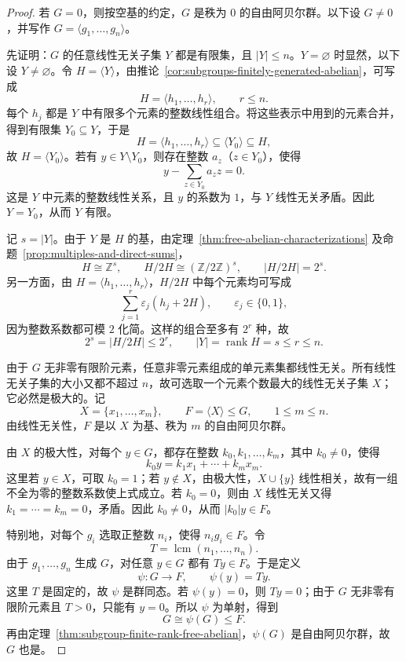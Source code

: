 \begin{proof}
若 $G=0$，则按空基的约定，$G$ 是秩为 $0$ 的自由阿贝尔群。以下设 $G\ne0$，并写作 $G=\langle g_1,\ldots,g_n\rangle$。

先证明：$G$ 的任意线性无关子集 $Y$ 都是有限集，且 $|Y|\leq n$。$Y=\varnothing$ 时显然，以下设 $Y\ne\varnothing$。令 $H=\langle Y\rangle$，由推论~\ref{cor:subgroups-finitely-generated-abelian}，可写成
\[
  H=\langle h_1,\ldots,h_r\rangle,\qquad r\leq n.
\]
每个 $h_j$ 都是 $Y$ 中有限多个元素的整数线性组合。将这些表示中用到的元素合并，得到有限集 $Y_0\subseteq Y$，于是
\[
  H=\langle h_1,\ldots,h_r\rangle
  \subseteq\langle Y_0\rangle\subseteq H,
\]
故 $H=\langle Y_0\rangle$。若有 $y\in Y\setminus Y_0$，则存在整数 $a_z$（$z\in Y_0$），使得
\[
  y-\sum_{z\in Y_0}a_z z=0.
\]
这是 $Y$ 中元素的整数线性关系，且 $y$ 的系数为 $1$，与 $Y$ 线性无关矛盾。因此 $Y=Y_0$，从而 $Y$ 有限。

记 $s=|Y|$。由于 $Y$ 是 $H$ 的基，由定理~\ref{thm:free-abelian-characterizations} 及命题~\ref{prop:multiples-and-direct-sums}，
\[
  H\cong\mathbb Z^s,\qquad
  H/2H\cong(\mathbb Z/2\mathbb Z)^s,
  \qquad |H/2H|=2^s.
\]
另一方面，由 $H=\langle h_1,\ldots,h_r\rangle$，$H/2H$ 中每个元素均可写成
\[
  \sum_{j=1}^{r}\varepsilon_j(h_j+2H),
  \qquad \varepsilon_j\in\{0,1\},
\]
因为整数系数都可模 $2$ 化简。这样的组合至多有 $2^r$ 种，故
\[
  2^s=|H/2H|\leq2^r,
  \qquad |Y|=\operatorname{rank}H=s\leq r\leq n.
\]

由于 $G$ 无非零有限阶元素，任意非零元素组成的单元素集都线性无关。所有线性无关子集的大小又都不超过 $n$，故可选取一个元素个数最大的线性无关子集 $X$；它必然是极大的。记
\[
  X=\{x_1,\ldots,x_m\},\qquad
  F=\langle X\rangle\leq G,\qquad 1\leq m\leq n.
\]
由线性无关性，$F$ 是以 $X$ 为基、秩为 $m$ 的自由阿贝尔群。

由 $X$ 的极大性，对每个 $y\in G$，都存在整数 $k_0,k_1,\ldots,k_m$，其中 $k_0\ne0$，使得
\[
  k_0y=k_1x_1+\cdots+k_mx_m.
\]
这里若 $y\in X$，可取 $k_0=1$；若 $y\notin X$，由极大性，$X\cup\{y\}$ 线性相关，故有一组不全为零的整数系数使上式成立。若 $k_0=0$，则由 $X$ 线性无关又得 $k_1=\cdots=k_m=0$，矛盾。因此 $k_0\ne0$，从而 $|k_0|y\in F$。

特别地，对每个 $g_i$ 选取正整数 $n_i$，使得 $n_ig_i\in F$。令
\[
  T=\operatorname{lcm}(n_1,\ldots,n_n).
\]
由于 $g_1,\ldots,g_n$ 生成 $G$，对任意 $y\in G$ 都有 $Ty\in F$。于是定义
\[
  \psi:G\longrightarrow F,\qquad \psi(y)=Ty.
\]
这里 $T$ 是固定的，故 $\psi$ 是群同态。若 $\psi(y)=0$，则 $Ty=0$；由于 $G$ 无非零有限阶元素且 $T>0$，只能有 $y=0$。所以 $\psi$ 为单射，得到
\[
  G\cong\psi(G)\leq F.
\]
再由定理~\ref{thm:subgroup-finite-rank-free-abelian}，$\psi(G)$ 是自由阿贝尔群，故 $G$ 也是。
\end{proof}

